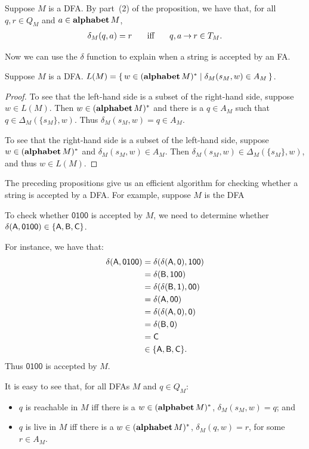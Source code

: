 Suppose $M$ is a DFA.  By part~(2) of the proposition, we have that,
for all $q,r\in Q_M$ and $a\in\mathbf{alphabet}\,M$,
\begin{gather*}
\delta_M(q,a)=r\quad\mathrel{\;\;\allowbreak\mbox{iff}\allowbreak\;\;}\quad q,a\mathbin{\to} r\in T_M .
\end{gather*}

Now we can use the $\delta$ function to explain when a string is
accepted by an FA.

\begin{proposition}
\label{DetermProp3}
Suppose $M$ is a DFA.
$L(M)=\{ \, w\in(\mathbf{alphabet}\,M)^* \mid \delta_M(s_M,w)\in A_M \, \}$.
\end{proposition}
\begin{proof}
To see that the left-hand side is a subset of the right-hand side,
suppose $w\in L(M)$.  Then $w\in(\mathbf{alphabet}\,M)^*$ and there is a $q\in A_M$
such that $q\in\Delta_M(\{s_M\},w)$.  Thus $\delta_M(s_M,w)=q\in A_M$.

To see that the right-hand side is a subset of the left-hand side,
suppose $w\in(\mathbf{alphabet}\,M)^*$ and $\delta_M(s_M,w)\in A_M$.  Then
$\delta_M(s_M,w)\in\Delta_M(\{s_M\},w)$, and thus $w\in L(M)$.
\end{proof}

The preceding propositions give us an efficient algorithm for checking
whether a string is accepted by a DFA.  For example, suppose
$M$ is the DFA
\begin{center}

\end{center}
To check whether $\mathsf{0100}$ is accepted by $M$, we need
to determine whether $\delta(\mathsf{A},\mathsf{0100})\in\{\mathsf{A},\mathsf{B},\mathsf{C}\}$.

For instance, we have that:
\begin{align*}
\delta(\mathsf{A},\mathsf{0100})
&= \delta(\delta(\mathsf{A}, \mathsf{0}),\mathsf{100}) \\
&= \delta(\mathsf{B},\mathsf{100}) \\
&= \delta(\delta(\mathsf{B},\mathsf{1}),\mathsf{00}) \\
&= \delta(\mathsf{A},\mathsf{00}) \\
&= \delta(\delta(\mathsf{A},\mathsf{0}),\mathsf{0}) \\
&= \delta(\mathsf{B},\mathsf{0}) \\
&= \mathsf{C} \\
&\in \{\mathsf{A},\mathsf{B},\mathsf{C}\}.
\end{align*}
Thus $\mathsf{0100}$ is accepted by $M$.

It is easy to see that, for all DFAs $M$ and $q\in Q_M$:
\begin{itemize}
\item $q$ is reachable in $M$ iff there is a $w\in(\mathbf{alphabet}\, M)^*$,
  $\delta_M(s_M, w) = q$;
%
%
and

\item $q$ is live in $M$ iff there is a $w\in(\mathbf{alphabet}\, M)^*$,
  $\delta_M(q, w) = r$, for some $r\in A_M$.
%
%
\end{itemize}

